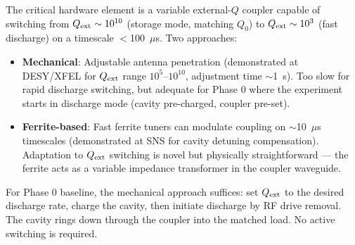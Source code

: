 \documentclass[11pt]{article}
\begin{document}
The critical hardware element is a variable external-$Q$ coupler
capable of switching from $Q_{\rm ext} \sim 10^{10}$ (storage mode,
matching $Q_0$) to $Q_{\rm ext} \sim 10^3$ (fast discharge) on a
timescale $<$100~$\mu$s. Two approaches:
\begin{itemize}[nosep]
  \item \textbf{Mechanical}: Adjustable antenna penetration
    (demonstrated at DESY/XFEL for $Q_{\rm ext}$ range $10^5$--$10^{10}$,
    adjustment time $\sim$1~s). Too slow for rapid discharge switching,
    but adequate for Phase 0 where the experiment starts in discharge
    mode (cavity pre-charged, coupler pre-set).
  \item \textbf{Ferrite-based}: Fast ferrite tuners can modulate
    coupling on $\sim$10~$\mu$s timescales (demonstrated at SNS for
    cavity detuning compensation). Adaptation to $Q_{\rm ext}$
    switching is novel but physically straightforward --- the ferrite
    acts as a variable impedance transformer in the coupler waveguide.
\end{itemize}

For Phase 0 baseline, the mechanical approach suffices: set
$Q_{\rm ext}$ to the desired discharge rate, charge the cavity,
then initiate discharge by RF drive removal. The cavity rings
down through the coupler into the matched load. No active switching
is required.
\end{document}
